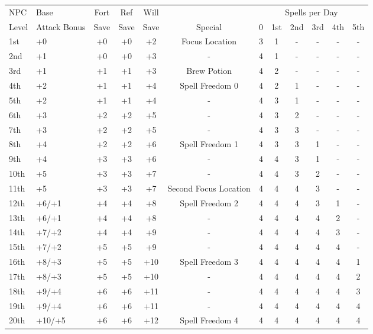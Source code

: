 \documentclass[11pt]{report}
\begin{document}
\begin{tabular}{llcccccccccc}
\hline
NPC & Base & Fort & Ref & Will & & \multicolumn{6}{c}{Spells per Day} \\
Level & Attack Bonus & Save & Save & Save & Special & 0 & 1st & 2nd & 3rd & 4th
& 5th \\
\hline
	1st & +0 & +0 & +0 & +2 & Focus Location & 3 & 1 & - & - & - & - \\
\tblbg	2nd & +1 & +0 & +0 & +3 & - & 4 & 1 & - & - & - & - \\
	3rd & +1 & +1 & +1 & +3 & Brew Potion & 4 & 2 & - & - & - & - \\
\tblbg	4th & +2 & +1 & +1 & +4 & Spell Freedom 0 & 4 & 2 & 1 & - & - & - \\
	5th & +2 & +1 & +1 & +4 & - & 4 & 3 & 1 & - & - & - \\
\tblbg	6th & +3 & +2 & +2 & +5 & - & 4 & 3 & 2 & - & - & - \\
	7th & +3 & +2 & +2 & +5 & - & 4 & 3 & 3 & - & - & - \\
\tblbg	8th & +4 & +2 & +2 & +6 & Spell Freedom 1 & 4 & 3 & 3 & 1 & - & - \\
	9th & +4 & +3 & +3 & +6 & - & 4 & 4 & 3 & 1 & - & - \\
\tblbg	10th & +5 & +3 & +3 & +7 & - & 4 & 4 & 3 & 2 & - & - \\
	11th & +5 & +3 & +3 & +7 & Second Focus Location & 4 & 4 & 4 & 3 & - & - \\
\tblbg	12th & +6/+1 & +4 & +4 & +8 & Spell Freedom 2 & 4 & 4 & 4 & 3 & 1 & - \\
	13th & +6/+1 & +4 & +4 & +8 & - & 4 & 4 & 4 & 4 & 2 & - \\
\tblbg	14th & +7/+2 & +4 & +4 & +9 & - & 4 & 4 & 4 & 4 & 3 & - \\
	15th & +7/+2 & +5 & +5 & +9 & - & 4 & 4 & 4 & 4 & 4 & - \\
\tblbg	16th & +8/+3 & +5 & +5 & +10 & Spell Freedom 3 & 4 & 4 & 4 & 4 & 4 & 1 \\
	17th & +8/+3 & +5 & +5 & +10 & - & 4 & 4 & 4 & 4 & 4 & 2 \\
\tblbg	18th & +9/+4 & +6 & +6 & +11 & - & 4 & 4 & 4 & 4 & 4 & 3 \\
	19th & +9/+4 & +6 & +6 & +11 & - & 4 & 4 & 4 & 4 & 4 & 4 \\
\tblbg	20th & +10/+5 & +6 & +6 & +12 & Spell Freedom 4 & 4 & 4 & 4 & 4 & 4 & 4 \\
\hline
\end{tabular}
\end{document}
